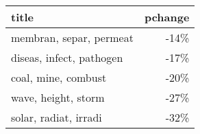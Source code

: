 \begin{tabular}{p{1.2cm}r}
\toprule
                    title &  pchange \\
\midrule
  membran, separ, permeat &     -14\% \\
 diseas, infect, pathogen &     -17\% \\
      coal, mine, combust &     -20\% \\
      wave, height, storm &     -27\% \\
    solar, radiat, irradi &     -32\% \\
\bottomrule
\end{tabular}
